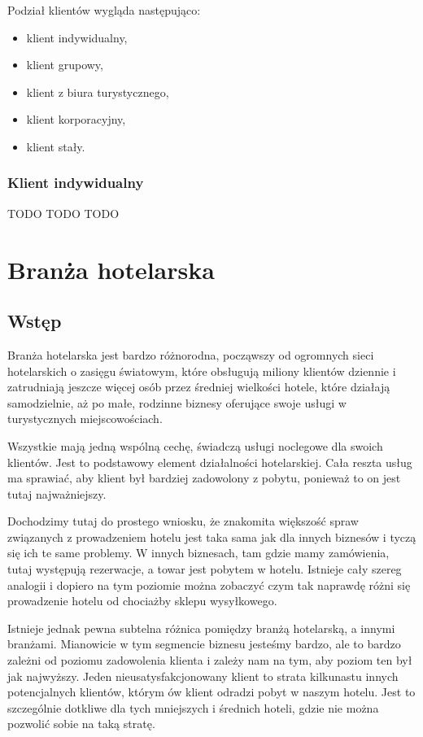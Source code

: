 \documentclass[a4paper,onecolumn,oneside,11pt,wide,floatssmall]{mwrep}
\theoremstyle{definition}
\theoremstyle{plain}%
\theoremstyle{remark}
\begin{document}
Podział klientów wygląda następująco:

\begin{itemize}
  \item klient indywidualny,
  \item klient grupowy,
  \item klient z biura turystycznego,
  \item klient korporacyjny,
  \item klient stały.
\end{itemize}

\subsubsection{Klient indywidualny}

TODO TODO TODO


\section{Branża hotelarska}

\subsection{Wstęp}

Branża hotelarska jest bardzo różnorodna, począwszy od ogromnych sieci
hotelarskich o zasięgu światowym, które obsługują miliony klientów dziennie i zatrudniają
 jeszcze więcej osób przez średniej wielkości hotele, które działają
 samodzielnie, aż po małe, rodzinne biznesy oferujące swoje usługi
 w turystycznych miejscowościach.
 
  Wszystkie mają jedną wspólną cechę,
 świadczą usługi noclegowe dla swoich klientów. Jest to podstawowy element
 działalności hotelarskiej. Cała reszta usług ma sprawiać, aby klient był
 bardziej zadowolony z pobytu, ponieważ to on jest tutaj najważniejszy.
 
  Dochodzimy tutaj do prostego wniosku, że znakomita
 większość spraw związanych z prowadzeniem hotelu jest taka sama jak dla innych
 biznesów i tyczą się ich te same problemy. W innych biznesach, tam gdzie mamy
 zamówienia, tutaj występują rezerwacje, a towar jest pobytem w hotelu. Istnieje
 cały szereg analogii i dopiero na tym poziomie można zobaczyć czym tak naprawdę
 różni się prowadzenie hotelu od chociażby sklepu wysyłkowego.
 
 Istnieje jednak pewna subtelna różnica pomiędzy branżą hotelarską, a innymi
 branżami. Mianowicie w tym segmencie biznesu jesteśmy bardzo, ale to bardzo
 zależni od poziomu zadowolenia klienta i zależy nam na tym, aby poziom ten był
 jak najwyższy. Jeden nieusatysfakcjonowany klient to strata kilkunastu
 innych potencjalnych klientów, którym ów klient odradzi pobyt w naszym hotelu.
 Jest to szczególnie dotkliwe dla tych mniejszych i średnich hoteli, gdzie nie
 można pozwolić sobie na taką stratę.
\end{document}

